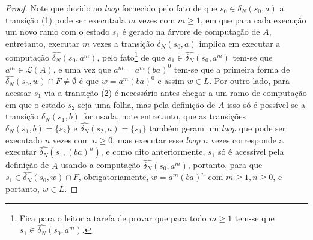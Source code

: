 \begin{example}
\begin{proof}
		Note que devido ao \textit{loop} fornecido pelo fato de que $s_0 \in \delta_N(s_0, a)$ a transição (1) pode ser executada $m$ vezes com $m \geq 1$, em que para cada execução um novo ramo com o estado $s_1$ é gerado na árvore de computação de $A$, entretanto, executar $m$ vezes a transição $\delta_N(s_0, a)$ implica em executar a computação $\widehat{\delta_N}(s_0, a^m)$, pelo fato\footnote{Fica para o leitor a tarefa de provar que para todo $m \geq 1$ tem-se que $s_1 \in \widehat{\delta_N}(s_0, a^m)$.} de que $s_1 \in \widehat{\delta_N}(s_0, a^m)$ tem-se que $a^m \in \mathcal{L}(A)$, e uma vez que $a^m = a^m(ba)^0$ tem-se que a primeira forma de $\widehat{\delta_N}(s_0, w) \cap F \neq \emptyset$ é que $w = a^m(ba)^0$ e assim $w \in L$. Por outro lado, para acessar $s_1$ via a transição (2) é necessário antes chegar a um ramo de computação em que o estado $s_2$ seja uma folha, mas pela definição de $A$ isso só é possível se a transição $\delta_N(s_1, b)$ for usada, note entretanto, que as transições $\delta_N(s_1, b) = \{s_2\}$ e $\widehat{\delta_N}(s_2, a) = \{s_1\}$ também geram um \textit{loop} que pode ser executado $n$ vezes com $n \geq 0$, mas executar esse \textit{loop} $n$ vezes corresponde a executar $\widehat{\delta_N}(s_1, (ba)^n)$, e como dito anteriormente, $s_1$ só é acessível pela definição de $A$ usando a computação $\widehat{\delta_N}(s_0, a^m)$, portanto, para que $s_1 \in \widehat{\delta_N}(s_0, w) \cap F$, obrigatoriamente, $w = a^m(ba)^n$ com $m \geq 1, n \geq 0$, e portanto, $w \in L$.
	\end{proof}
\end{example}

